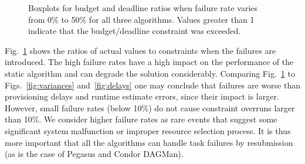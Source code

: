 \documentclass[conference]{IEEEtran}
\begin{document}
\begin{figure}[tb]
    \hspace{2cm}
    \caption{Boxplots for budget and deadline ratios when failure rate varies
    from 0\% to 50\% for all three algorithms. Values greater than 1 indicate 
    that the budget/deadline constraint was exceeded.}
    \label{fig:failures}
\end{figure}

Fig.~\ref{fig:failures} shows the ratios of actual values to constraints when
the failures are introduced. The high failure rates have a high impact on the
performance of the static algorithm and can degrade the solution considerably.
Comparing Fig.~\ref{fig:failures} to Figs.~\ref{fig:variances}
and~\ref{fig:delays} one may conclude that failures are worse than
provisioning delays and runtime estimate errors, since their impact is larger.
However, small failure rates (below 10\%) do not cause constraint overruns
larger than 10\%. We consider higher failure rates as rare events that suggest
some significant system malfunction or improper resource selection
process. It is thus more important that all the algorithms can handle task
failures by resubmission (as is the case of Pegasus and Condor DAGMan).
\end{document}
